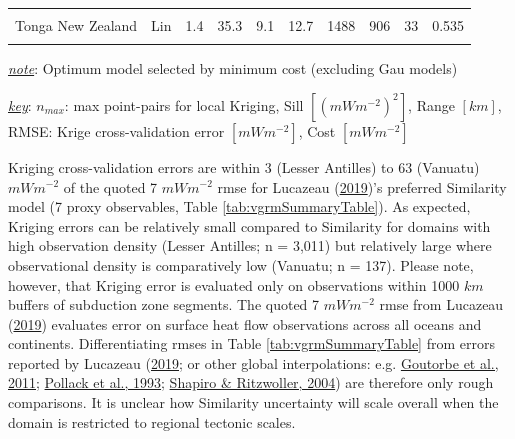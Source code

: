 \begin{table}
{\begin{threeparttable}
\begin{tabular}[t]{llrrrrrrrr}
\cellcolor{gray!6}{Sumatra Banda Sea} & \cellcolor{gray!6}{Exp} & \cellcolor{gray!6}{10.6} & \cellcolor{gray!6}{47.6} & \cellcolor{gray!6}{7.9} & \cellcolor{gray!6}{12.6} & \cellcolor{gray!6}{1238} & \cellcolor{gray!6}{11} & \cellcolor{gray!6}{20} & \cellcolor{gray!6}{0.263}\\
Tonga New Zealand & Lin & 1.4 & 35.3 & 9.1 & 12.7 & 1488 & 906 & 33 & 0.535\\
\cellcolor{gray!6}{Vanuatu} & \cellcolor{gray!6}{Bes} & \cellcolor{gray!6}{4.5} & \cellcolor{gray!6}{37.6} & \cellcolor{gray!6}{7.9} & \cellcolor{gray!6}{12.3} & \cellcolor{gray!6}{3195} & \cellcolor{gray!6}{122} & \cellcolor{gray!6}{70} & \cellcolor{gray!6}{0.518}\\
\bottomrule
\end{tabular}
\begin{tablenotes}
\item \uline{\textit{note}}: Optimum model selected by minimum cost (excluding Gau models)
\item \uline{\textit{key}}: $n_{max}$: max point-pairs for local Kriging, Sill $[(mWm^{-2})^2]$, Range $[km]$, RMSE: Krige cross-validation error $[mWm^{-2}]$, Cost $[mWm^{-2}]$
\end{tablenotes}
\end{threeparttable}}
\end{table}

Kriging cross-validation errors are within 3 (Lesser Antilles) to 63 (Vanuatu) \(mWm^{-2}\) of the quoted 7 \(mWm^{-2}\) \gls{rmse} for Lucazeau (\protect\hyperlink{ref-lucazeau2019}{2019})'s preferred Similarity model (7 proxy observables, Table \ref{tab:vgrmSummaryTable}). As expected, Kriging errors can be relatively small compared to Similarity for domains with high observation density (Lesser Antilles; n = 3,011) but relatively large where observational density is comparatively low (Vanuatu; n = 137). Please note, however, that Kriging error is evaluated only on observations within 1000 \(km\) buffers of subduction zone segments. The quoted 7 \(mWm^{-2}\) \gls{rmse} from Lucazeau (\protect\hyperlink{ref-lucazeau2019}{2019}) evaluates error on surface heat flow observations across all oceans and continents. Differentiating \glspl{rmse} in Table \ref{tab:vgrmSummaryTable} from errors reported by Lucazeau (\protect\hyperlink{ref-lucazeau2019}{2019}; or other global interpolations: e.g. \protect\hyperlink{ref-goutorbe2011}{Goutorbe et al., 2011}; \protect\hyperlink{ref-pollack1993}{Pollack et al., 1993}; \protect\hyperlink{ref-shapiro2004}{Shapiro \& Ritzwoller, 2004}) are therefore only rough comparisons. It is unclear how Similarity uncertainty will scale overall when the domain is restricted to regional tectonic scales.

